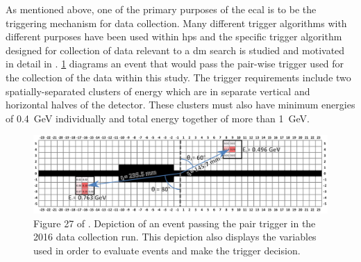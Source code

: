 As mentioned above, one of the primary purposes of the \ac{ecal} is to be the triggering mechanism
for data collection. Many different trigger algorithms with different purposes have been used
within \ac{hps} and the specific trigger algorithm designed for collection of data relevant to a
\ac{dm} search is studied and motivated in detail in \cite{skmccarty-thesis-2020}.
\cref{fig:hps-pair-trigger-depiction} diagrams an event that would pass the pair-wise trigger used
for the collection of the data within this study. The trigger requirements include two
spatially-separated clusters of energy which are in separate vertical and horizontal halves of the
detector. These clusters must also have minimum energies of \qty{0.4}{\giga\electronvolt}
individually and total energy together of more than \qty{1}{\giga\electronvolt}. 

\begin{figure}
  \centering
  \includegraphics[width=\textwidth]{figures/hps/experiment/smckarty-thesis-fig-27-pair-trigger-depiction.png}
  \caption{
    Figure 27 of \cite{skmccarty-thesis-2020}. Depiction of an event passing the pair trigger
    in the 2016 data collection run. This depiction also displays the variables used in order
    to evaluate events and make the trigger decision.
  }
  \label{fig:hps-pair-trigger-depiction}
\end{figure}